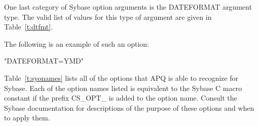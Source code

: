 \documentclass[english,letterpaper]{book}
\begin{document}
One last category of Sybase option arguments is the DATEFORMAT argument
type. The valid list of values for this type of argument are given in Table~\ref{t:dtfmt}.

The following is an example of such an option:

\begin{Example}

   "DATEFORMAT=YMD"

\end{Example}

Table~\ref{t:syonames} lists all of the options that APQ is able to recognize for Sybase.
Each of the option names listed is equivalent to the 
Sybase C macro
constant if the prefix CS\_OPT\_ is added to the option name. Consult
the Sybase documentation for descriptions of the purpose of these
options and when to apply them.
\end{document}
